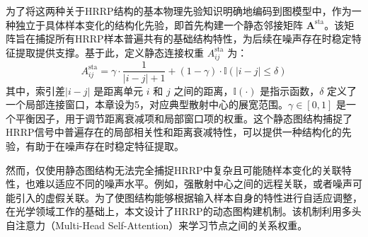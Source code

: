 为了将这两种关于HRRP结构的基本物理先验知识明确地编码到图模型中，作为一种独立于具体样本变化的结构化先验，即首先构建一个静态邻接矩阵 $\mathbf{A}^{\text{sta}}$。该矩阵旨在捕捉所有HRRP样本普遍共有的基础结构特性，为后续在噪声存在时稳定特征提取提供支撑。基于此，定义静态连接权重 $A^{\text{sta}}_{ij}$ 为：
\begin{equation}
    A^{\text{sta}}_{ij} = \gamma \cdot \frac{1}{|i-j|+1} + (1-\gamma) \cdot \mathbb{I}(|i-j| \leq \delta)
    \label{eq:static_adjacency}
\end{equation}
其中，索引差$|i-j|$ 是距离单元 $i$ 和 $j$ 之间的距离，$\mathbb{I}(\cdot)$ 是指示函数，$\delta$ 定义了一个局部连接窗口，本章设为5，对应典型散射中心的展宽范围。$\gamma \in [0,1]$ 是一个平衡因子，用于调节距离衰减项和局部窗口项的权重。这个静态图结构捕捉了HRRP信号中普遍存在的局部相关性和距离衰减特性，可以提供一种结构化的先验，有助于在噪声存在时稳定特征提取。

然而，仅使用静态图结构无法完全捕捉HRRP中复杂且可能随样本变化的关联特性，也难以适应不同的噪声水平。例如，强散射中心之间的远程关联，或者噪声可能引入的虚假关联。为了使图结构能够根据输入样本自身的特性进行自适应调整，在光学领域工作的基础上，本文设计了HRRP的动态图构建机制。该机制利用多头自注意力（Multi-Head Self-Attention）来学习节点之间的关系权重。

